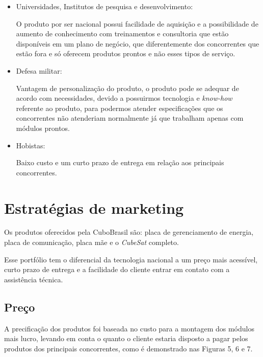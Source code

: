 \documentclass[
	12pt,				%
	openright,			%
	oneside,			%
	a4paper,			%
	english,			%
	french,				%
	spanish,			%
	brazil				%
	]{abntex2}
\begin{document}
	\begin{itemize}
		\item Universidades, Institutos de pesquisa e desenvolvimento:
		
		O produto por ser nacional possui facilidade de aquisição e a possibilidade de aumento de conhecimento com treinamentos e consultoria que estão disponíveis em um plano de negócio, que diferentemente dos concorrentes que estão fora e só oferecem produtos prontos e não esses tipos de serviço.
		
		\item Defesa militar:
		
		Vantagem de personalização do produto, o produto pode se adequar de acordo com necessidades, devido a possuirmos tecnologia e \textit{know-how} referente ao produto, para podermos atender especificações que os concorrentes não atenderiam normalmente já que trabalham apenas com módulos prontos.
		
		\item Hobistas:
		
		Baixo custo e um curto prazo de entrega em relação aos principais concorrentes.
	\end{itemize}
	
\section[Estratégias de marketing]{Estratégias de marketing}

	Os produtos oferecidos pela CuboBrasil são: placa de gerenciamento de energia, placa de comunicação, placa mãe e o \textit{CubeSat} completo.
	
	Esse portfólio tem o diferencial da tecnologia nacional a um preço mais acessível, curto prazo de entrega e a facilidade do cliente entrar em contato com a assistência técnica.
	
\subsection[Preço]{Preço}

	 A precificação dos produtos foi baseada no custo para a montagem dos módulos mais lucro, levando em conta o quanto o cliente estaria disposto a pagar pelos produtos dos principais concorrentes, como é demonstrado nas Figuras 5, 6 e 7.
	 
\end{document}
